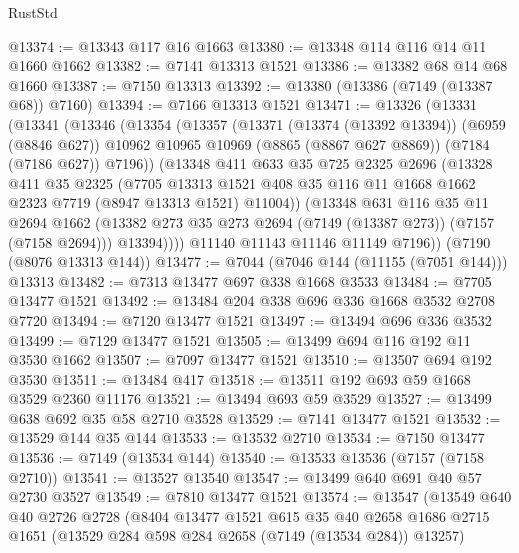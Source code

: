 \begin{lexlean}{RustStd}
\begin{coremodule}
@13374 := @13343 @117 @16 @1663
@13380 := @13348 @114 @116 @14 @11 @1660 @1662
@13382 := @7141 @13313 @1521
@13386 := @13382 @68 @14 @68 @1660
@13387 := @7150 @13313
@13392 := @13380 (@13386 (@7149 (@13387 @68)) @7160)
@13394 := @7166 @13313 @1521
@13471 := @13326
    (@13331
      (@13341
        (@13346
          (@13354
            (@13357
              (@13371
                (@13374 (@13392 @13394))
                (@6959 (@8846 @627))
                @10962
                @10965
                @10969
                (@8865 (@8867 @627 @8869))
                (@7184 (@7186 @627))
                @7196))
            (@13348
              @411
              @633
              @35
              @725
              @2325
              @2696
              (@13328
                @411
                @35
                @2325
                (@7705
                  @13313
                  @1521
                  @408
                  @35
                  @116
                  @11
                  @1668
                  @1662
                  @2323
                  @7719
                  (@8947 @13313 @1521)
                  @11004))
              (@13348
                @631
                @116
                @35
                @11
                @2694
                @1662
                (@13382 @273 @35 @273 @2694 (@7149 (@13387 @273)) (@7157 (@7158 @2694)))
                @13394))))
        @11140
        @11143
        @11146
        @11149
        @7196))
    (@7190 (@8076 @13313 @144))
@13477 := @7044 (@7046 @144 (@11155 (@7051 @144))) @13313
@13482 := @7313 @13477 @697 @338 @1668 @3533
@13484 := @7705 @13477 @1521
@13492 := @13484 @204 @338 @696 @336 @1668 @3532 @2708 @7720
@13494 := @7120 @13477 @1521
@13497 := @13494 @696 @336 @3532
@13499 := @7129 @13477 @1521
@13505 := @13499 @694 @116 @192 @11 @3530 @1662
@13507 := @7097 @13477 @1521
@13510 := @13507 @694 @192 @3530
@13511 := @13484 @417
@13518 := @13511 @192 @693 @59 @1668 @3529 @2360 @11176
@13521 := @13494 @693 @59 @3529
@13527 := @13499 @638 @692 @35 @58 @2710 @3528
@13529 := @7141 @13477 @1521
@13532 := @13529 @144 @35 @144
@13533 := @13532 @2710
@13534 := @7150 @13477
@13536 := @7149 (@13534 @144)
@13540 := @13533 @13536 (@7157 (@7158 @2710))
@13541 := @13527 @13540
@13547 := @13499 @640 @691 @40 @57 @2730 @3527
@13549 := @7810 @13477 @1521
@13574 := @13547
    (@13549
      @640
      @40
      @2726
      @2728
      (@8404
        @13477
        @1521
        @615
        @35
        @40
        @2658
        @1686
        @2715
        @1651
        (@13529 @284 @598 @284 @2658 (@7149 (@13534 @284)) @13257)

\end{coremodule}
\end{lexlean}
